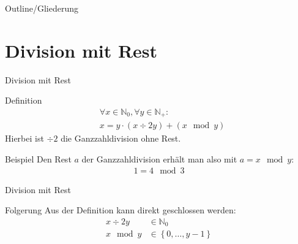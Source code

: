 
\subtitle{Foliensatz 4}
\date{15. November 2012}



\begin{frame}
    \titlepage
\end{frame}

\begin{frame}{Outline/Gliederung}
    \tableofcontents
\end{frame}

\section{Division mit Rest}

\begin{frame}{Division mit Rest}
    \begin{block}{Definition}
        \begin{align*}
            &\forall x \in \mathbb{N}_0, \forall y \in \mathbb{N}_+:\\
            &x = y\cdot\left( x \div2 y\right) + \left( x\mod y\right)
        \end{align*}
        Hierbei ist $\div2$ die Ganzzahldivision ohne Rest.
    \end{block}
    \pause
    \begin{exampleblock}{Beispiel}
        Den Rest $a$ der Ganzzahldivision erhält man also mit $a = x \mod y$:
        \begin{align*}
            1 = 4 \mod 3
        \end{align*}
    \end{exampleblock}
\end{frame}

\begin{frame}{Division mit Rest}
    \begin{block}{Folgerung}
        Aus der Definition kann direkt geschlossen werden:
        \begin{align*}
            x \div2 y &\in \mathbb{N}_0\\
            x \mod y &\in \left\{ 0, \dots , y-1\right\}
        \end{align*}
    \end{block}
\end{frame}

